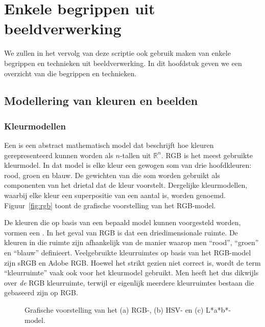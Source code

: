 \chapter{Enkele begrippen uit beeldverwerking}

We zullen in het vervolg van deze scriptie ook gebruik maken van enkele
begrippen en technieken uit beeldverwerking. In dit hoofdstuk geven we 
een overzicht van die begrippen en technieken.

\section{Modellering van kleuren en beelden}

\subsection{Kleurmodellen}

Een  is een abstract mathematisch model dat beschrijft hoe kleuren gerepresenteerd 
kunnen worden als $n$-tallen uit $\mathbb{R}^n$. RGB is het meest gebruikte kleurmodel. In 
dat model is elke kleur een gewogen som van drie hoofdkleuren: rood, groen en blauw. De 
gewichten van die som worden gebruikt als componenten van het drietal dat de kleur 
voorstelt. Dergelijke kleurmodellen,
waarbij elke kleur een superpositie van een aantal  is, 
worden  genoemd. Figuur~\ref{fig:rgb}
toont de grafische voorstelling van het RGB-model. 

De kleuren die op basis van een bepaald model kunnen voorgesteld worden, vormen een . 
In het geval van RGB is dat een driedimensionale ruimte. De kleuren in die ruimte zijn afhankelijk
van de manier waarop men ``rood'', ``groen'' en ``blauw'' definieert. Veelgebruikte kleurruimtes 
op basis van het RGB-model zijn sRGB en Adobe RGB.
Hoewel het strikt gezien niet correct is, wordt de term ``kleurruimte'' vaak ook voor het
kleurmodel gebruikt. Men heeft het dus dikwijls over \emph{de} RGB kleurruimte, terwijl er eigenlijk meerdere
kleurruimtes bestaan die gebaseerd zijn op RGB. 

\begin{figure}[bp]
\vspace{10pt}
\centering
{}
\qquad
{}
\qquad
{}
\caption{\label{fig:kleurmodellen}Grafische voorstelling van het (a) RGB-, 
(b) HSV- en (c) L*a*b*-model.}
\end{figure}

